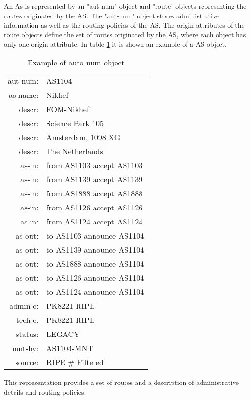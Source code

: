 \documentclass[11pt,a4paper]{scrreprt}
\begin{document}
An As is represented by an "aut-num" object and "route" objects representing the routes originated by the AS. The "aut-num" object stores administrative information as well as the routing policies of the AS. The origin attributes of the route objects define the set of routes originated by the AS, where each object has only one origin attribute. In table \ref{table:4} it is shown an example of a AS object.  
    
\begin{table}[!h]
\centering
\begin{tabular}{  r  l  }

aut-num:    &      	AS1104\\
as-name:    &      	Nikhef\\
descr:   	&     	FOM-Nikhef\\
descr:   	&    	Science Park 105\\
descr:		&   		Amsterdam, 1098 XG\\
descr:   	&	    The Netherlands\\
as-in:  		&       from AS1103 accept AS1103\\
as-in:  		&       from AS1139 accept AS1139\\
as-in:  		&       from AS1888 accept AS1888\\
as-in:  		&       from AS1126 accept AS1126\\
as-in:  		&       from AS1124 accept AS1124\\
as-out:  	&       to AS1103 announce AS1104\\
as-out:  	&       to AS1139 announce AS1104\\
as-out:  	&       to AS1888 announce AS1104\\
as-out:  	&       to AS1126 announce AS1104\\
as-out:  	&       to AS1124 announce AS1104\\
admin-c: 	&       PK8221-RIPE\\
tech-c:  	&       PK8221-RIPE\\
status:  	&       LEGACY\\
mnt-by:  	&       AS1104-MNT\\
source:  	&       RIPE \# Filtered\\

\end{tabular}
\caption{Example of auto-num object}
\label{table:4}
\end{table} 

This representation provides a set of routes and a description of administrative details and routing policies. 
        
\end{document}
